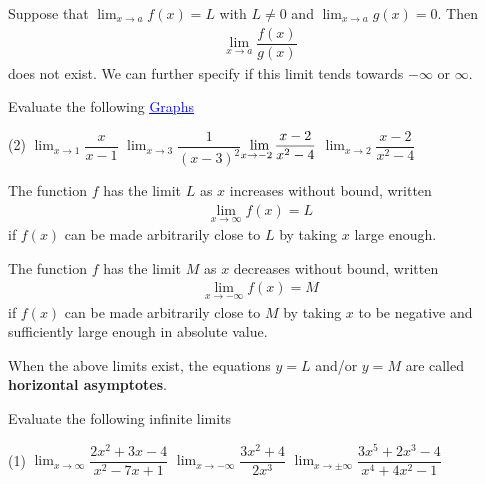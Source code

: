 \documentclass[../mathNotesPreamble]{subfiles}
\begin{document}
  \noindent
  Suppose that $\displaystyle \lim_{x\to a} f(x)=L$ with $L\neq 0$ and $\displaystyle \lim_{x\to a} g(x)=0$. Then
  \begin{align*}
    \lim_{x\to a} \dfrac{f(x)}{g(x)}
  \end{align*}
  does not exist. We can further specify if this limit tends towards
  $-\infty$ or $\infty$.

  \begin{ex*}
    Evaluate the following \hfill \href{https://www.desmos.com/calculator/svhfldwwmo}{\textcolor{blue}{\underline{Graphs}}}
  \end{ex*}
  \begin{extasks}[after-item-skip=\stretch{1}](2)
    \task $\displaystyle \lim_{x\to 1} \dfrac{x}{x-1}$
    \task $\displaystyle \lim_{x\to 3} \dfrac{1}{(x-3)^2}$
    \task $\displaystyle \lim_{\mathllap{x}\to -2} \dfrac{x-2}{x^2-4}$
    \task $\displaystyle \lim_{x\to 2} \dfrac{x-2}{x^2-4}$
  \end{extasks}
  \pagebreak

  \begin{thmBox*}
    The function $f$ has the limit $L$ as $x$ increases without bound, written
    \begin{align*}
      \lim_{x\to \infty} f(x)=L
    \end{align*}
    if $f(x)$ can be made arbitrarily close to $L$ by taking $x$ large enough.

    The function $f$ has the limit $M$ as $x$ decreases without bound, written
    \begin{align*}
      \lim_{x\to -\infty} f(x)=M
    \end{align*}
    if $f(x)$ can be made arbitrarily close to $M$ by taking $x$ to be negative and sufficiently large enough in absolute value.

    When the above limits exist, the equations $y=L$ and/or $y=M$ are called \textbf{horizontal asymptotes}.
  \end{thmBox*}
  \begin{ex*}
    Evaluate the following infinite limits
  \end{ex*}
  \begin{extasks}[after-item-skip=\stretch{1}](1)
    \task $\displaystyle \lim_{x\to \infty} \dfrac{2x^2+3x-4}{x^2-7x+1}$
    \task $\displaystyle \lim_{x\to -\infty} \dfrac{3x^2+4}{2x^3}$
    \task $\displaystyle \lim_{x\to \pm\infty} \dfrac{3x^5+2x^3-4}{x^4+4x^2-1}$
  \end{extasks}
  \pagebreak
\end{document}
